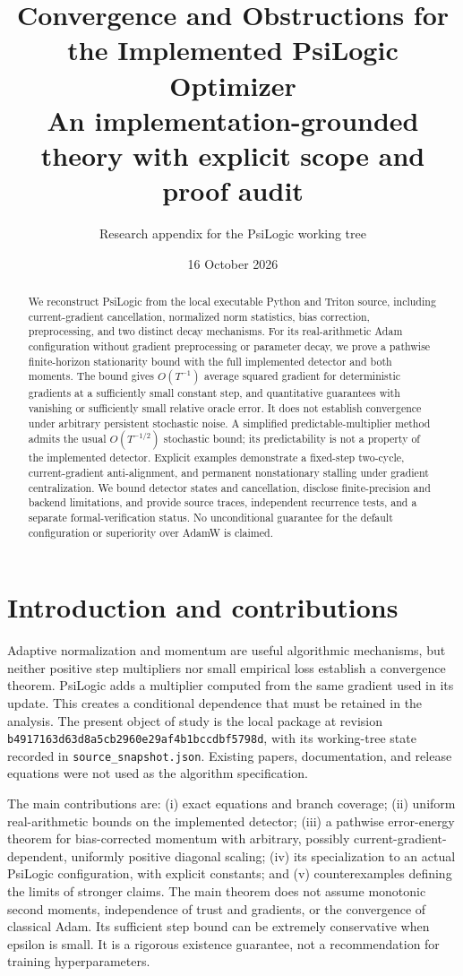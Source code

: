 \documentclass[11pt]{article}
\title{Convergence and Obstructions for the Implemented PsiLogic Optimizer\\
\large An implementation-grounded theory with explicit scope and proof audit}
\author{Research appendix for the PsiLogic working tree}
\date{16 October 2026}
\theoremstyle{definition}
\theoremstyle{remark}
\begin{document}
\maketitle
\begin{abstract}
We reconstruct PsiLogic from the local executable Python and Triton source,
including current-gradient cancellation, normalized norm statistics, bias
correction, preprocessing, and two distinct decay mechanisms. For its
real-arithmetic Adam configuration without gradient preprocessing or parameter
decay, we prove a pathwise finite-horizon stationarity bound with the full
implemented detector and both moments. The bound gives $O(T^{-1})$ average
squared gradient for deterministic gradients at a sufficiently small constant
step, and quantitative guarantees with vanishing or sufficiently small relative
oracle error. It does not establish convergence under arbitrary persistent
stochastic noise. A simplified predictable-multiplier method admits the usual
$O(T^{-1/2})$ stochastic bound; its predictability is not a property of the
implemented detector. Explicit examples demonstrate a fixed-step two-cycle,
current-gradient anti-alignment, and permanent nonstationary stalling under
gradient centralization. We bound detector states and cancellation, disclose
finite-precision and backend limitations, and provide source traces,
independent recurrence tests, and a separate formal-verification status.
No unconditional guarantee for the default configuration or superiority over
AdamW is claimed.
\end{abstract}

\section{Introduction and contributions}
Adaptive normalization and momentum are useful algorithmic mechanisms, but
neither positive step multipliers nor small empirical loss establish a
convergence theorem. PsiLogic adds a multiplier computed from the same gradient
used in its update. This creates a conditional dependence that must be retained
in the analysis. The present object of study is the local package at revision
\texttt{b4917163d63d8a5cb2960e29af4b1bccdbf5798d}, with its working-tree state
recorded in \texttt{source\_snapshot.json}. Existing papers, documentation, and
release equations were not used as the algorithm specification.

The main contributions are: (i) exact equations and branch coverage;
(ii) uniform real-arithmetic bounds on the implemented detector;
(iii) a pathwise error-energy theorem for bias-corrected momentum with arbitrary,
possibly current-gradient-dependent, uniformly positive diagonal scaling;
(iv) its specialization to an actual PsiLogic configuration, with explicit
constants; and (v) counterexamples defining the limits of stronger claims.
The main theorem does not assume monotonic second moments, independence of
trust and gradients, or the convergence of classical Adam. Its sufficient step
bound can be extremely conservative when epsilon is small. It is a rigorous
existence guarantee, not a recommendation for training hyperparameters.
\end{document}
